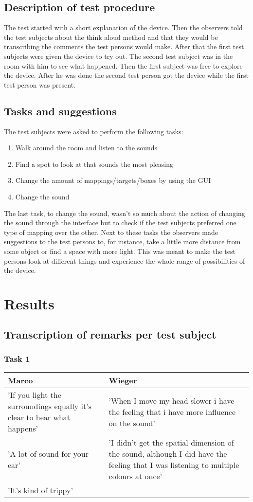 \documentclass[11pt]{article}
\begin{document}
\subsection{Description of test procedure}
The test started with a short explanation of the device. Then the observers told the test subjects about the think aloud method and that they would be transcribing the comments the test persons would make. After that the first test subjects were given the device to try out. The second test subject was in the room with him to see what happened. Then the first subject was free to explore the device. After he was done the second test person got the device while the first test person was present. 
\subsection{Tasks and suggestions}
The test subjects were asked to perform the following tasks:
\begin{enumerate}
\item Walk around the room and listen to the sounds
\item Find a spot to look at that sounds the most pleasing
\item Change the amount of mappings/targets/boxes by using the GUI
\item Change the sound
\end{enumerate}
The last task, to change the sound, wasn't so much about the action of changing the sound through the interface but to check if the test subjects preferred one type of mapping over the other. 
Next to these tasks the observers made suggestions to the test persons to, for instance, take a little more distance from some object or find a space with more light. This was meant to make the test persons look at different things and experience the whole range of possibilities of the device.
\section{Results}
\subsection{Transcription of remarks per test subject}
\subsubsection{Task 1}
\begin{center}
    \begin{tabular}{| p{6cm} | p{6cm} |}
    \hline
  	Marco & Wieger \\ \hline
	'If you light the surroundings equally it's clear to hear what happens' & 'When I move my 			head slower i have the feeling that i have more influence on the sound' \\
	'A lot of sound for your ear' & 'I didn't get the spatial dimension of the sound, although I did 		have the feeling that I was listening to multiple colours at once'\\
	'It's kind of trippy' & \\ \hline
	
    \end{tabular}
\end{center}
\end{document}
